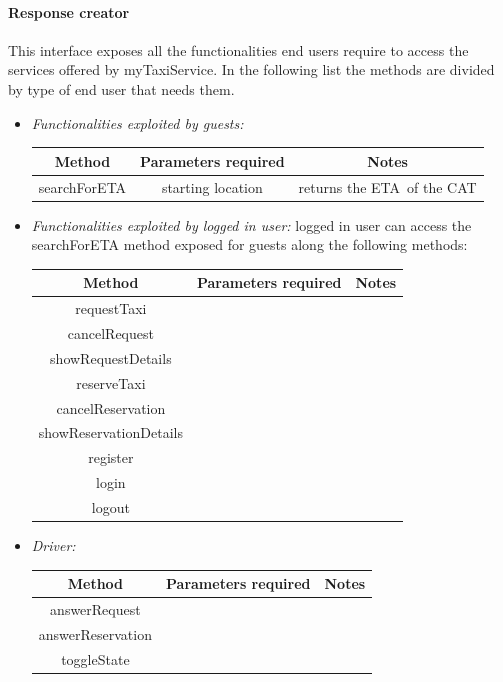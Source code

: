 \documentclass{article}
\begin{document}
\paragraph{Response creator}
This interface exposes all the functionalities end users require to access the services offered by myTaxiService. 
In the following list the methods are divided by type of end user that needs them.
\begin{itemize}
	\item \textit{Functionalities exploited by guests:}	
			\begin{tabular}{*{3}{c}}
				\toprule
				Method & Parameters required & Notes \\
				\midrule
				searchForETA & starting location & returns the ETA\footnotemark\  of the CAT\footnotemark\\ %
				\bottomrule
			\end{tabular}
	
	\item \textit{Functionalities exploited by logged in user:} logged in user can access the searchForETA method exposed for guests along the following methods:
		\begin{tabular}{*{3}{c}}
			\toprule
			Method & Parameters required & Notes \\
			\midrule
			requestTaxi &  & \\ %
			cancelRequest & & \\ %
			showRequestDetails & & \\
			reserveTaxi & &  \\
			cancelReservation & & \\
			showReservationDetails & & \\
			register & & \\
			login & & \\
			logout & & \\
			\bottomrule
		\end{tabular}

	\item \textit{Driver:}

				\begin{tabular}{*{3}{c}}
					\toprule
					Method & Parameters required & Notes \\
					\midrule
					answerRequest & & \\ %
					answerReservation & & \\ %
					toggleState & & \\
					\bottomrule
				\end{tabular}


\end{itemize}
\end{document}
